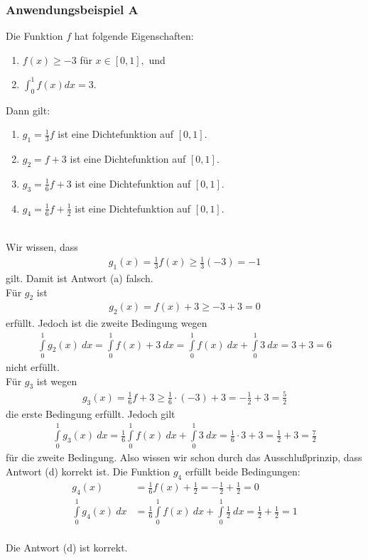 \subsubsection*{Anwendungsbeispiel A}
Die Funktion $f$ hat folgende Eigenschaften:
\renewcommand{\labelenumi}{(\roman{enumi})}
\begin{enumerate}
\item $f(x) \geq -3 $ für $x \in [0,1],$ und
\item $\int_0^1 f(x) dx = 3$.
\end{enumerate}
Dann gilt:
\renewcommand{\labelenumi}{(\alph{enumi})}
\begin{enumerate}
\item $g_1  =  \frac{1}{3} f $ ist eine Dichtefunktion auf $[0,1]$.
\item $g_2  =   f +3 $ ist eine Dichtefunktion auf $[0,1]$.
\item
$g_3  =  \frac{1}{6} f +3 $ ist eine Dichtefunktion auf $[0,1]$.
\item
$g_4  =  \frac{1}{6} f + \frac{1}{2} $ ist eine Dichtefunktion auf $[0,1]$.
\end{enumerate}
\ \\
Wir wissen, dass
\begin{align*}
g_1(x) = \frac{1}{3} f(x) \geq \frac{1}{3} (-3) = -1
\end{align*}
gilt.
Damit ist Antwort (a) falsch.\\
Für $g_2$ ist
\begin{align*}
g_2(x) = f(x) + 3 \geq -3 +3 = 0
\end{align*}
erfüllt. Jedoch ist die zweite Bedingung wegen
\begin{align*}
\int \limits_0^1 g_2(x) \ dx 
= 
\int \limits_0^1 f(x) + 3 \ dx
=
\int \limits_0^1 f(x) \ dx + \int \limits_0^1 3 \ dx
=
3 + 3 = 6
\end{align*}
nicht erfüllt.\\
Für $g_3$ ist wegen 
\begin{align*}
g_3(x) = \frac{1}{6} f + 3 \geq \frac{1}{6} \cdot (-3) +3
= -\frac{1}{2} +3 = \frac{5}{2}
\end{align*}
die erste Bedingung erfüllt.
Jedoch gilt
\begin{align*}
\int \limits_0^1 g_3(x) \ dx
= 
\frac{1}{6} \int \limits_0^1 f(x) \ dx + \int \limits_0^1 3 \ dx
= 
\frac{1}{6} \cdot 3 +  3 = \frac{1}{2} + 3 = \frac{7}{2}
\end{align*}
für die zweite Bedingung.
Also wissen wir schon durch das Ausschlußprinzip, dass Antwort (d) korrekt ist.
Die Funktion $g_4$ erfüllt beide Bedingungen:
\begin{align*}
g_4(x) &= \frac{1}{6} f(x) + \frac{1}{2}
= - \frac{1}{2} + \frac{1}{2} = 0\\
\int \limits_0^1 g_4(x) \ dx &=
\frac{1}{6} \int \limits_0^1 f(x) \ dx + \int \limits_0^1 \frac{1}{2} \ dx
= \frac{1}{2} + \frac{1}{2} = 1
\end{align*}
\ \\
Die Antwort (d) ist korrekt.